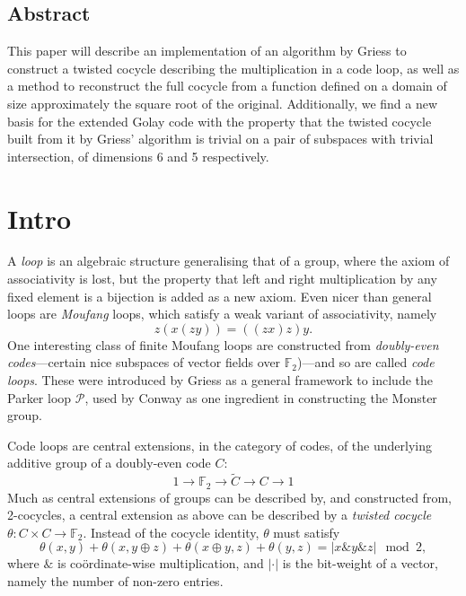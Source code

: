\documentclass[a4paper,debug]{tufte-handout}
\title{\TheTitle}
\date{\today}
\author{Ben Nagy and David Michael Roberts}
\theoremstyle{plain}
\theoremstyle{definition}
\theoremstyle{remark}
\def\cP{\mathcal{P}}
\def\FF{\mathbb{F}}
\def\And{\mathbin{\&}}
\def\Plus{\oplus}
\begin{document}
\maketitle

\medskip

\subsection{Abstract}
\noindent This paper will describe an implementation of an algorithm by Griess to construct a twisted cocycle describing the multiplication in a code loop, as well as a method to reconstruct the full cocycle from a function defined on a domain of size approximately the square root of the original. 
Additionally, we find a new basis for the extended Golay code with the property that the twisted cocycle built from it by Griess' algorithm is trivial on a pair of subspaces with trivial intersection, of dimensions 6 and 5 respectively.


\section{Intro}

A \emph{loop} is an algebraic structure generalising that of a group, where the axiom of associativity is lost, but the property that left and right multiplication by any fixed element is a bijection is added as a new axiom.
Even nicer than general loops are \emph{Moufang} loops, which satisfy a weak variant of associativity, namely
\[
	z(x(zy)) = ((zx)z)y.
\]
One interesting class of finite Moufang loops are constructed from \emph{doubly-even codes}---certain nice subspaces of vector fields over $\FF_2$)---and so are called \emph{code loops}. 
These were introduced by Griess\cite{Griess} as a general framework to include the Parker loop $\cP$, used by Conway as one ingredient in constructing the Monster group.

Code loops are central extensions, in the category of codes, of the underlying additive group of a doubly-even code $C$:
\[
	1\to \FF_2 \to \widetilde{C} \to C \to 1
\]
Much as central extensions of groups can be described by, and constructed from, 2-cocycles, a central extension as above can be described by a \emph{twisted cocycle} $\theta\colon C\times C \to \FF_2$. 
Instead of the cocycle identity, $\theta$ must satisfy
\[
	\theta(x,y) + \theta(x,y\Plus z) + \theta(x\Plus y,z) + \theta(y,z) = |x\And  y \And  z| \mod 2,
\]
where $\And $ is co\"ordinate-wise multiplication, and $|\cdot|$ is the bit-weight of a vector, namely the number of non-zero entries.
\end{document}
